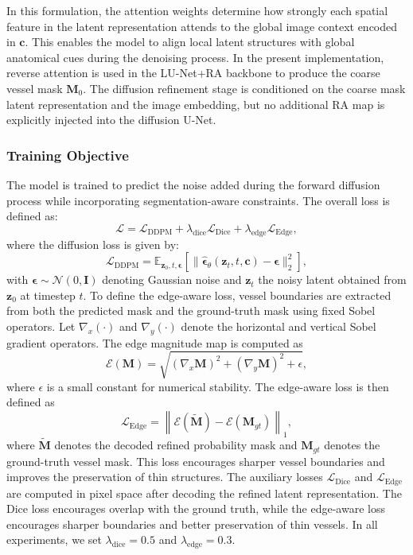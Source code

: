 \documentclass[journal,article,submit,pdftex,moreauthors]{Definitions/mdpi}
\begin{document}
In this formulation, the attention weights determine how strongly each spatial feature in the latent representation attends to the global image context encoded in $\mathbf{c}$. This enables the model to align local latent structures with global anatomical cues during the denoising process. In the present implementation, reverse attention is used in the LU-Net+RA backbone to produce the coarse vessel mask $\mathbf{M}_0$. The diffusion refinement stage is conditioned on the coarse mask latent representation and the image embedding, but no additional RA map is explicitly injected into the diffusion U-Net.

\subsubsection{Training Objective}

The model is trained to predict the noise added during the forward diffusion process while incorporating segmentation-aware constraints. The overall loss is defined as:
\begin{equation}
\mathcal{L}=
\mathcal{L}_{\text{DDPM}}+
\lambda_{\text{dice}}\mathcal{L}_{\text{Dice}}+
\lambda_{\text{edge}}\mathcal{L}_{\text{Edge}},
\end{equation}
where the diffusion loss is given by:
\begin{equation}
\mathcal{L}_{\text{DDPM}}=
\mathbb{E}_{\mathbf{z}_0,t,\boldsymbol{\epsilon}}\left[
\|\hat{\boldsymbol{\epsilon}}_\theta(\mathbf{z}_t,t,\mathbf{c})-\boldsymbol{\epsilon}\|_2^2
\right],
\end{equation}
with $\boldsymbol{\epsilon}\sim\mathcal{N}(0,\mathbf{I})$ denoting Gaussian noise and $\mathbf{z}_t$ the noisy latent obtained from $\mathbf{z}_0$ at timestep $t$.
To define the edge-aware loss, vessel boundaries are extracted from both the predicted mask and the ground-truth mask using fixed Sobel operators. Let $\nabla_x(\cdot)$ and $\nabla_y(\cdot)$ denote the horizontal and vertical Sobel gradient operators. The edge magnitude map is computed as
\begin{equation}
\mathcal{E}(\mathbf{M}) =
\sqrt{
\left(\nabla_x \mathbf{M}\right)^2 +
\left(\nabla_y \mathbf{M}\right)^2 + \epsilon
},
\end{equation}
where $\epsilon$ is a small constant for numerical stability. The edge-aware loss is then defined as
\begin{equation}
\mathcal{L}_{\text{Edge}} =
\left\|
\mathcal{E}(\tilde{\mathbf{M}}) -
\mathcal{E}(\mathbf{M}_{gt})
\right\|_1,
\end{equation}
where $\tilde{\mathbf{M}}$ denotes the decoded refined probability mask and $\mathbf{M}_{gt}$ denotes the ground-truth vessel mask. This loss encourages sharper vessel boundaries and improves the preservation of thin structures.
The auxiliary losses $\mathcal{L}_{\text{Dice}}$ and $\mathcal{L}_{\text{Edge}}$ are computed in pixel space after decoding the refined latent representation. The Dice loss encourages overlap with the ground truth, while the edge-aware loss encourages sharper boundaries and better preservation of thin vessels. In all experiments, we set $\lambda_{\text{dice}}=0.5$ and $\lambda_{\text{edge}}=0.3$.%
\end{document}
